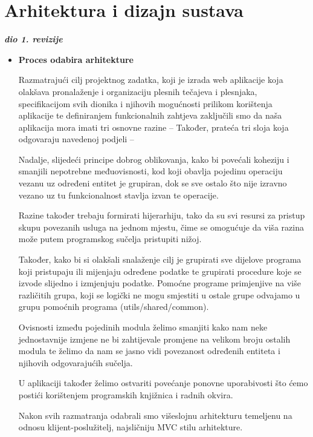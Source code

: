 \chapter{Arhitektura i dizajn sustava}
		
		\textbf{\textit{dio 1. revizije}}\\

	\begin{itemize}
		\item \textbf{Proces odabira arhitekture}

Razmatrajući cilj projektnog zadatka, koji je izrada web aplikacije koja olakšava pronalaženje i organizaciju plesnih tečajeva i plesnjaka, specifikacijom svih dionika i njihovih mogućnosti prilikom korištenja aplikacije te definiranjem funkcionalnih zahtjeva zaključili smo da naša aplikacija mora imati tri osnovne razine –  Također, prateća tri sloja koja odgovaraju navedenoj podjeli –  

Nadalje, slijedeći principe dobrog oblikovanja, kako bi povećali koheziju i smanjili nepotrebne međuovisnosti, kod koji obavlja pojedinu operaciju vezanu uz određeni entitet je grupiran, dok se sve ostalo što nije izravno vezano uz tu funkcionalnost stavlja izvan te operacije. 

Razine također trebaju formirati hijerarhiju, tako da su svi resursi za pristup skupu povezanih usluga na jednom mjestu, čime se omogućuje da viša razina može putem programskog sučelja pristupiti nižoj. 

Također, kako bi si olakšali snalaženje cilj je grupirati sve dijelove programa koji pristupaju ili mijenjaju određene podatke te grupirati procedure koje se izvode slijedno i izmjenjuju podatke. Pomoćne programe primjenjive na više različitih grupa, koji se logički ne mogu smjestiti u ostale grupe odvajamo u grupu pomoćnih programa (utils/shared/common).

Ovisnosti između pojedinih modula želimo smanjiti kako nam neke jednostavnije izmjene ne bi zahtijevale promjene na velikom broju ostalih modula te želimo da nam se jasno vidi povezanost određenih entiteta i njihovih odgovarajućih sučelja. 

U aplikaciji također želimo ostvariti povećanje ponovne uporabivosti što ćemo postići korištenjem programskih knjižnica i radnih okvira. 

Nakon svih razmatranja odabrali smo višeslojnu arhitekturu temeljenu na odnosu klijent-poslužitelj, najsličniju MVC stilu arhitekture.



\end{itemize}
